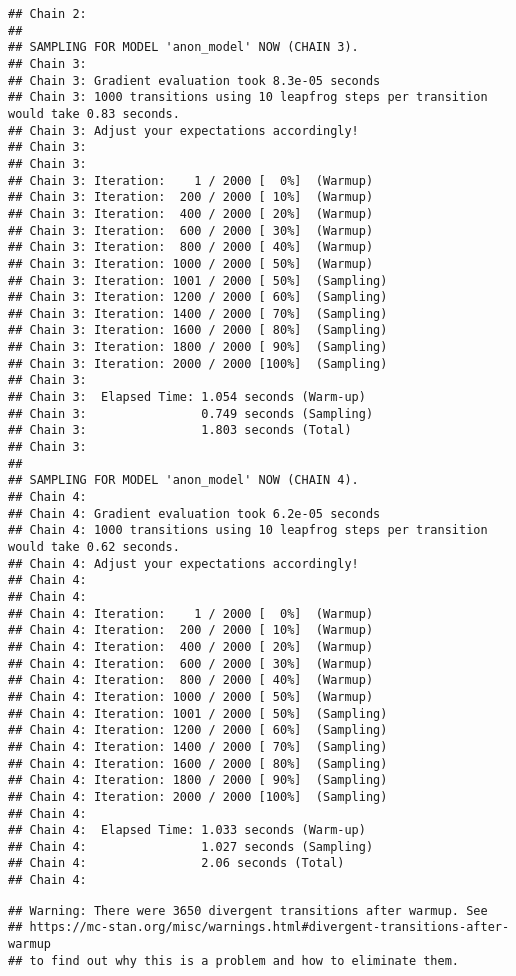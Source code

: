 \documentclass[
]{article}
\begin{document}
\begin{verbatim}
## Chain 2: 
## 
## SAMPLING FOR MODEL 'anon_model' NOW (CHAIN 3).
## Chain 3: 
## Chain 3: Gradient evaluation took 8.3e-05 seconds
## Chain 3: 1000 transitions using 10 leapfrog steps per transition would take 0.83 seconds.
## Chain 3: Adjust your expectations accordingly!
## Chain 3: 
## Chain 3: 
## Chain 3: Iteration:    1 / 2000 [  0%]  (Warmup)
## Chain 3: Iteration:  200 / 2000 [ 10%]  (Warmup)
## Chain 3: Iteration:  400 / 2000 [ 20%]  (Warmup)
## Chain 3: Iteration:  600 / 2000 [ 30%]  (Warmup)
## Chain 3: Iteration:  800 / 2000 [ 40%]  (Warmup)
## Chain 3: Iteration: 1000 / 2000 [ 50%]  (Warmup)
## Chain 3: Iteration: 1001 / 2000 [ 50%]  (Sampling)
## Chain 3: Iteration: 1200 / 2000 [ 60%]  (Sampling)
## Chain 3: Iteration: 1400 / 2000 [ 70%]  (Sampling)
## Chain 3: Iteration: 1600 / 2000 [ 80%]  (Sampling)
## Chain 3: Iteration: 1800 / 2000 [ 90%]  (Sampling)
## Chain 3: Iteration: 2000 / 2000 [100%]  (Sampling)
## Chain 3: 
## Chain 3:  Elapsed Time: 1.054 seconds (Warm-up)
## Chain 3:                0.749 seconds (Sampling)
## Chain 3:                1.803 seconds (Total)
## Chain 3: 
## 
## SAMPLING FOR MODEL 'anon_model' NOW (CHAIN 4).
## Chain 4: 
## Chain 4: Gradient evaluation took 6.2e-05 seconds
## Chain 4: 1000 transitions using 10 leapfrog steps per transition would take 0.62 seconds.
## Chain 4: Adjust your expectations accordingly!
## Chain 4: 
## Chain 4: 
## Chain 4: Iteration:    1 / 2000 [  0%]  (Warmup)
## Chain 4: Iteration:  200 / 2000 [ 10%]  (Warmup)
## Chain 4: Iteration:  400 / 2000 [ 20%]  (Warmup)
## Chain 4: Iteration:  600 / 2000 [ 30%]  (Warmup)
## Chain 4: Iteration:  800 / 2000 [ 40%]  (Warmup)
## Chain 4: Iteration: 1000 / 2000 [ 50%]  (Warmup)
## Chain 4: Iteration: 1001 / 2000 [ 50%]  (Sampling)
## Chain 4: Iteration: 1200 / 2000 [ 60%]  (Sampling)
## Chain 4: Iteration: 1400 / 2000 [ 70%]  (Sampling)
## Chain 4: Iteration: 1600 / 2000 [ 80%]  (Sampling)
## Chain 4: Iteration: 1800 / 2000 [ 90%]  (Sampling)
## Chain 4: Iteration: 2000 / 2000 [100%]  (Sampling)
## Chain 4: 
## Chain 4:  Elapsed Time: 1.033 seconds (Warm-up)
## Chain 4:                1.027 seconds (Sampling)
## Chain 4:                2.06 seconds (Total)
## Chain 4:
\end{verbatim}

\begin{verbatim}
## Warning: There were 3650 divergent transitions after warmup. See
## https://mc-stan.org/misc/warnings.html#divergent-transitions-after-warmup
## to find out why this is a problem and how to eliminate them.
\end{verbatim}
\end{document}
